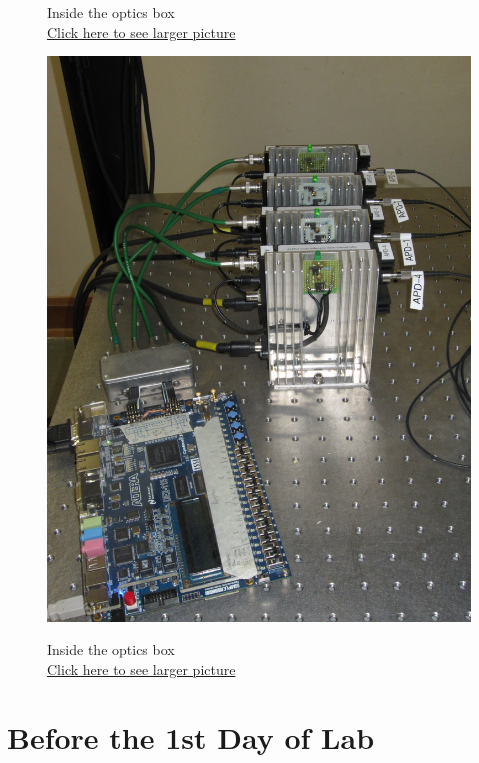 \documentclass{../lab}
\begin{document}
\begin{figure}[H]
  \caption{Inside the optics box \\
  \href{http://experimentationlab.berkeley.edu/sites/default/files/images/QIE_0615.jpg}{Click here to see larger picture}}
  \label{fig:QIE_0615.jpg}
\endminipage\hfill
{}
  \href{http://experimentationlab.berkeley.edu/sites/default/files/images/QIE_APDs_0616.jpg}{\includegraphics[width=\linewidth,keepaspectratio]{images/QIE_APDs_0616.jpg}}
  \caption{Inside the optics box \\ \href{http://experimentationlab.berkeley.edu/sites/default/files/images/QIE_APDs_0616.jpg}{Click here to see larger picture}}\label{fig:QIE_APDs_0616.jpg}
\endminipage
\end{figure}

\section{Before the 1st Day of Lab}
\end{document}
